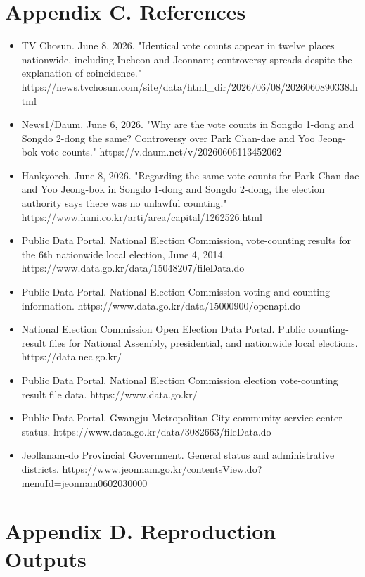 \documentclass[preprint]{../ieie/IEIE}
\begin{document}
\section*{Appendix C. References}

\begin{itemize}
\item TV Chosun. June 8, 2026. "Identical vote counts appear in twelve places nationwide, including Incheon and Jeonnam; controversy spreads despite the explanation of coincidence." https://news.tvchosun.com/site/data/html\_dir/2026/06/08/2026060890338.html
\item News1/Daum. June 6, 2026. "Why are the vote counts in Songdo 1-dong and Songdo 2-dong the same? Controversy over Park Chan-dae and Yoo Jeong-bok vote counts." https://v.daum.net/v/20260606113452062
\item Hankyoreh. June 8, 2026. "Regarding the same vote counts for Park Chan-dae and Yoo Jeong-bok in Songdo 1-dong and Songdo 2-dong, the election authority says there was no unlawful counting." https://www.hani.co.kr/arti/area/capital/1262526.html
\item Public Data Portal. National Election Commission, vote-counting results for the 6th nationwide local election, June 4, 2014. https://www.data.go.kr/data/15048207/fileData.do
\item Public Data Portal. National Election Commission voting and counting information. https://www.data.go.kr/data/15000900/openapi.do
\item National Election Commission Open Election Data Portal. Public counting-result files for National Assembly, presidential, and nationwide local elections. https://data.nec.go.kr/
\item Public Data Portal. National Election Commission election vote-counting result file data. https://www.data.go.kr/
\item Public Data Portal. Gwangju Metropolitan City community-service-center status. https://www.data.go.kr/data/3082663/fileData.do
\item Jeollanam-do Provincial Government. General status and administrative districts. https://www.jeonnam.go.kr/contentsView.do?menuId=jeonnam0602030000
\end{itemize}

\section*{Appendix D. Reproduction Outputs}
\end{document}
